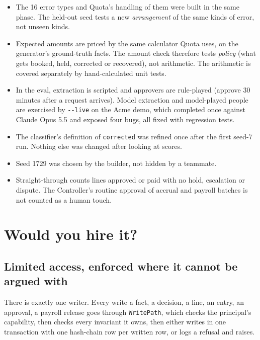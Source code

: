 \documentclass[10pt,a4paper]{article}
\newcommand{\gy}[1]{{\color{qgrey}#1}}
\newcommand{\code}[1]{{\small\texttt{#1}}}
\begin{document}
\begin{callout}
\begin{itemize}
\item The 16 error types and Quota's handling of them were built in the same phase. The held-out seed tests a new \emph{arrangement} of the same kinds of error, not unseen kinds.
\item Expected amounts are priced by the same calculator Quota uses, on the generator's ground-truth facts. The amount check therefore tests \emph{policy} \gy{(what gets booked, held, corrected or recovered)}, not arithmetic. The arithmetic is covered separately by hand-calculated unit tests.
\item In the eval, extraction is scripted and approvers are rule-played \gy{(approve 30 minutes after a request arrives)}. Model extraction and model-played people are exercised by \code{-{}-live} on the Acme demo, which completed once against Claude Opus 5.5 and exposed four bugs, all fixed with regression tests.
\item The classifier's definition of \code{corrected} was refined once after the first seed-7 run. Nothing else was changed after looking at scores.
\item Seed 1729 was chosen by the builder, not hidden by a teammate.
\item Straight-through counts lines approved or paid with no hold, escalation or dispute. The Controller's routine approval of accrual and payroll batches is not counted as a human touch.
\end{itemize}
\end{callout}

\section{Would you hire it?}

\subsection{Limited access, enforced where it cannot be argued with}

There is exactly one writer. Every write \textemdash{} a fact, a decision, a line, an entry, an approval, a payroll release \textemdash{} goes through \code{WritePath}, which checks the principal's capability, then checks every invariant it owns, then either writes in one transaction with one hash-chain row per written row, or logs a refusal and raises.
\end{document}
